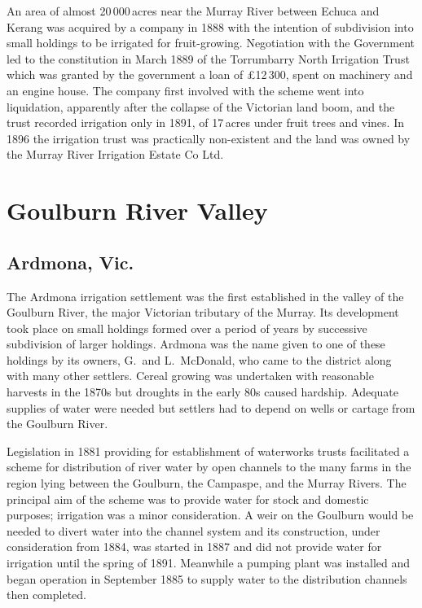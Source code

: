 An area of almost 20\,000\,acres near the Murray River between Echuca
and Kerang was acquired by a company in 1888 with the intention of
subdivision into small holdings to be irrigated for
fruit-growing.  Negotiation with the Government led to
the constitution in March 1889 of the Torrumbarry North Irrigation
Trust  which was granted by
the government a loan of \pounds12\,300, spent on machinery and an
engine house.  The company first involved with the scheme went into
liquidation, apparently after the collapse of the Victorian land boom,
and the trust recorded irrigation only in 1891, of 17\,acres under
fruit trees and vines.  In 1896 the irrigation trust
was practically non-existent and the land was owned by the Murray
River Irrigation Estate Co Ltd.

\section*{Goulburn River Valley}

\subsection*{Ardmona, Vic.}

The Ardmona irrigation settlement was the first established in the
valley of the Goulburn River, the major Victorian tributary of the
Murray.  Its development took place on small holdings formed over a
period of years by successive subdivision of larger holdings.  Ardmona
was the name given to one of these holdings by its owners, G.~and
L.~McDonald,   who came to the district
along with many other settlers.  Cereal growing was
undertaken with reasonable harvests in the 1870s but
droughts in the early 80s caused hardship.  Adequate
supplies of water were needed but settlers had to depend on wells or
cartage from the Goulburn River.

Legislation in 1881 providing for establishment of waterworks trusts
facilitated a scheme for distribution of river water by open
channels to the many farms in the region
lying between the Goulburn, the Campaspe, and the Murray Rivers.  The
principal aim of the scheme was to provide water for stock and
domestic purposes; irrigation was a minor consideration.  A weir on
the Goulburn would be needed to divert water into the channel system
and its construction, under consideration from 1884, was started in
1887 and did not provide water for irrigation until the spring of
1891. Meanwhile a pumping plant was installed
and began operation in September 1885 to supply water to the
distribution channels then
completed.

